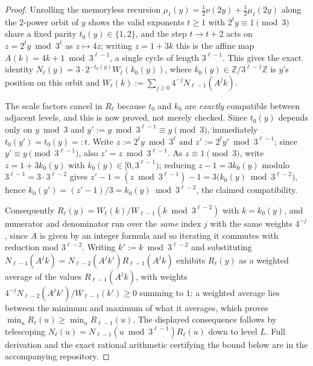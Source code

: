 \documentclass[11pt]{article}
\theoremstyle{definition}
\theoremstyle{remark}
\begin{document}
\begin{proof}
Unrolling the memoryless recursion $\mu_\ell(y)=\tfrac12\nu(2y)+
\tfrac12\mu_\ell(2y)$ along the $2$-power orbit of $y$ shows the valid
exponents $t\ge1$ with $2^ty\equiv1\pmod3$ share a fixed parity
$t_0(y)\in\{1,2\}$, and the step $t\to t+2$ acts on $z=2^ty\bmod3^\ell$
as $z\mapsto4z$; writing $z=1+3k$ this is the affine map
$A(k)=4k+1\bmod3^{\ell-1}$, a single cycle of length $3^{\ell-1}$. This
gives the exact identity $N_\ell(y)=3\cdot2^{-t_0(y)}W_\ell(k_0(y))$,
where $k_0(y)\in\mathbb Z/3^{\ell-1}\mathbb Z$ is $y$'s position on this
orbit and $W_\ell(k):=\sum_{j\ge0}4^{-j}N_{\ell-1}(A^jk)$.

The scale factors cancel in $R_\ell$ because $t_0$ and $k_0$ are
\emph{exactly} compatible between adjacent levels, and this is now
proved, not merely checked. Since $t_0(y)$ depends only on $y\bmod3$
and $y':=y\bmod3^{\ell-1}\equiv y\pmod3$, immediately $t_0(y')=t_0(y)=:t$.
Write $z:=2^ty\bmod3^\ell$ and $z':=2^ty'\bmod3^{\ell-1}$; since
$y'\equiv y\pmod{3^{\ell-1}}$, also $z'=z\bmod3^{\ell-1}$. As $z\equiv1
\pmod3$, write $z=1+3k_0(y)$ with $k_0(y)\in[0,3^{\ell-1})$; reducing
$z-1=3k_0(y)$ modulo $3^{\ell-1}=3\cdot3^{\ell-2}$ gives
$z'-1=(z\bmod3^{\ell-1})-1=3\bigl(k_0(y)\bmod3^{\ell-2}\bigr)$, hence
$k_0(y')=(z'-1)/3=k_0(y)\bmod3^{\ell-2}$, the claimed compatibility.

Consequently $R_\ell(y)=W_\ell(k)/W_{\ell-1}(k\bmod3^{\ell-2})$ with
$k=k_0(y)$, and numerator and denominator run over the \emph{same}
index $j$ with the same weights $4^{-j}$, since $A$ is given by an
integer formula and so iterating it commutes with reduction mod
$3^{\ell-2}$. Writing $k':=k\bmod3^{\ell-2}$ and substituting
$N_{\ell-1}(A^jk)=N_{\ell-2}(A^jk')R_{\ell-1}(A^jk)$ exhibits $R_\ell(y)$
as a weighted average of the values $R_{\ell-1}(A^jk)$, with weights
$4^{-j}N_{\ell-2}(A^jk')/W_{\ell-1}(k')\ge0$ summing to $1$; a weighted
average lies between the minimum and maximum of what it averages,
which proves $\min_uR_\ell(u)\ge\min_uR_{\ell-1}(u)$. The displayed
consequence follows by telescoping
$N_\ell(u)=N_{\ell-1}(u\bmod3^{\ell-1})R_\ell(u)$ down to level $L$.
Full derivation and the exact rational arithmetic certifying the bound
below are in the accompanying repository.
\end{proof}
\end{document}
